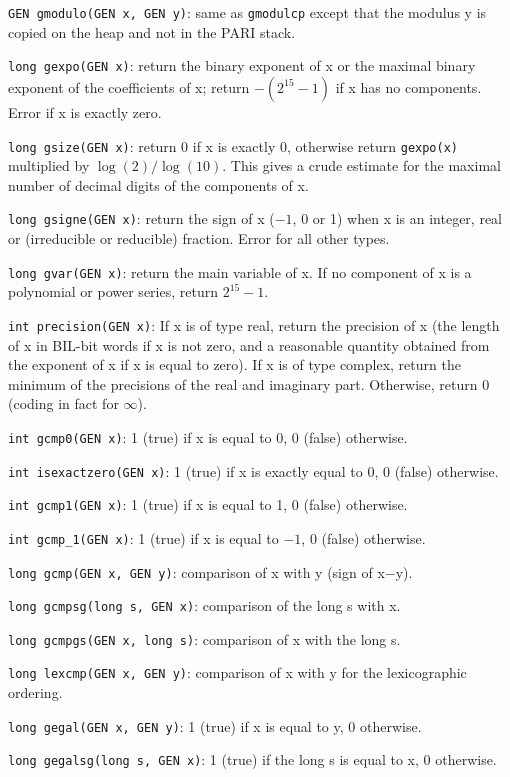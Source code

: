 {\tt GEN gmodulo(GEN x, GEN y)}: same as {\tt gmodulcp} except that the modulus
y is copied on the heap and not in the PARI stack.

{\tt long gexpo(GEN x)}: return the binary exponent of x or the maximal
binary exponent of the coefficients of x; return $-(2^{15}-1)$ if x has no
components. Error if x is exactly zero.

{\tt long gsize(GEN x)}: return 0 if x is exactly 0, otherwise return
{\tt gexpo(x)} multiplied by $\log(2)/\log(10)$. This gives a crude estimate
for the maximal number of decimal digits of the components of x.

{\tt long gsigne(GEN x)}: return the sign of x ($-1$, 0 or 1) when x is an 
integer, real or (irreducible or reducible) fraction. Error for all other
types.

{\tt long gvar(GEN x)}: return the main variable of x. If no component of
x is a polynomial or power series, return $2^{15}-1$.

{\tt int precision(GEN x)}: If x is of type real, return the precision of
x (the length of x in BIL-bit words if x is not zero, and a reasonable
quantity obtained from the exponent of x if x is equal to zero). If x
is of type complex, return the minimum of the precisions of the real and
imaginary part. Otherwise, return 0 (coding in fact for $\infty$).


{\tt int gcmp0(GEN x)}: 1 (true) if x is equal to 0, 0 (false) otherwise.

{\tt int isexactzero(GEN x)}: 1 (true) if x is exactly equal to 0, 0 (false)
otherwise.

{\tt int gcmp1(GEN x)}: 1 (true) if x is equal to 1, 0 (false) otherwise.

{\tt int gcmp\_1(GEN x)}: 1 (true) if x is equal to $-1$, 0 (false) otherwise.

{\tt long gcmp(GEN x, GEN y)}: comparison of x with y (sign of x$-$y).

{\tt long gcmpsg(long s, GEN x)}: comparison of the long s with x.

{\tt long gcmpgs(GEN x, long s)}: comparison of x with the long s.

{\tt long lexcmp(GEN x, GEN y)}: comparison of x with y for the lexicographic
ordering.

{\tt long gegal(GEN x, GEN y)}: 1 (true) if x is equal to y, 0 otherwise.

{\tt long gegalsg(long s, GEN x)}: 1 (true) if the long s is equal to x, 0
otherwise.

